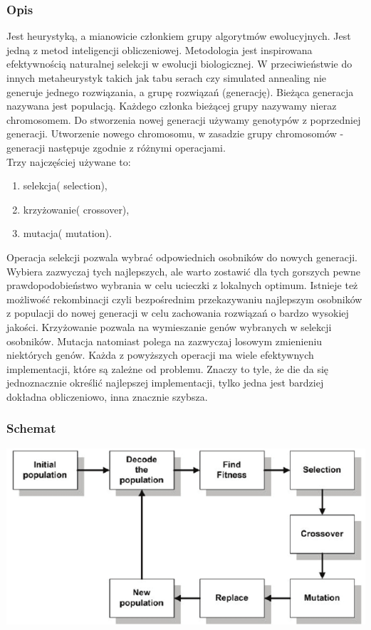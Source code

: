 \documentclass[11pt]{article}
\begin{document}
\subsubsection{Opis}
Jest heurystyką, a mianowicie członkiem grupy algorytmów ewolucyjnych. Jest jedną z metod inteligencji obliczeniowej. Metodologia jest inspirowana efektywnością naturalnej selekcji w ewolucji biologicznej. W przeciwieństwie do innych metaheurystyk takich jak tabu serach czy simulated annealing nie generuje jednego rozwiązania, a grupę rozwiązań (generację). Bieżąca generacja nazywana jest populacją. Każdego członka bieżącej grupy nazywamy nieraz chromosomem. Do stworzenia nowej generacji używamy genotypów z poprzedniej generacji. Utworzenie nowego chromosomu, w zasadzie grupy chromosomów - generacji następuje zgodnie z różnymi operacjami.\\ Trzy najczęściej używane to: \begin{enumerate}
\item selekcja( selection),
\item krzyżowanie( crossover),
\item mutacja( mutation). 
\end{enumerate} 
Operacja selekcji pozwala wybrać odpowiednich osobników do nowych generacji. Wybiera zazwyczaj tych najlepszych, ale warto zostawić dla tych gorszych pewne prawdopodobieństwo wybrania w celu ucieczki z lokalnych optimum. Istnieje też możliwość rekombinacji czyli bezpośrednim przekazywaniu najlepszym osobników z populacji do nowej generacji w celu zachowania rozwiązań o bardzo wysokiej jakości. Krzyżowanie pozwala na wymieszanie genów wybranych w selekcji osobników. Mutacja natomiast polega na zazwyczaj losowym zmienieniu niektórych genów. Każda z powyższych operacji ma wiele efektywnych implementacji, które są zależne od problemu. Znaczy to tyle, że die da się jednoznacznie określić  najlepszej implementacji, tylko jedna jest bardziej dokładna obliczeniowo, inna znacznie szybsza.
\subsubsection{Schemat}
\centering
\includegraphics[scale=0.5]{ga_ex.png}
\flushleft
\end{document}
